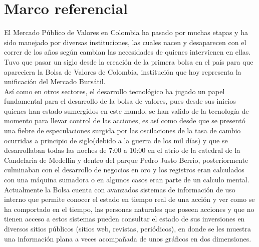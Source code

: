 \chapter{Marco referencial}
El Mercado Público de Valores en Colombia ha pasado por muchas etapas y ha sido manejado por diversas instituciones, las cuales nacen y desaparecen con el correr de los años según cambian las necesidades de quienes intervienen en ellas. Tuvo que pasar un siglo desde la creación de la primera bolsa en el país para que apareciera la Bolsa de Valores de Colombia, institución que hoy representa la unificación del Mercado Bursátil.\cite{RePEc:col:000159:003891}\\

Así como en otros sectores, el desarrollo tecnológico ha jugado un papel fundamental para el desarrollo de la bolsa de valores, pues desde sus inicios quienes han estado sumergidos en este mundo, se han valido de la tecnología de momento para llevar control de las acciones, es así como desde que se presentó una fiebre de especulaciones surgida por las oscilaciones de la tasa de cambio ocurridas a principio de siglo(debido a la guerra de los mil días) y que se desarrollaban todas las noches de 7:00 a 10:00 en el atrio de la catedral de la Candelaria de Medellín y dentro del parque Pedro Justo Berrio\cite{RepEEc:col:piedrahita}, posteriormente culminaban con el desarrollo de negocios en oro y los registros eran calculados con una máquina sumadora o en algunos casos eran parte de un calculo mental. Actualmente la Bolsa cuenta con avanzados sistemas de información de uso interno que permite conocer el estado en tiempo real de una acción y ver como se ha comportado en el tiempo, las personas naturales que poseen acciones y que no tienen acceso a estos sistemas pueden consultar el estado de sus inversiones en diversos sitios públicos (sitios web, revistas, periódicos), en donde se les muestra una información plana a veces acompañada de unos gráficos en dos dimensiones.\\

